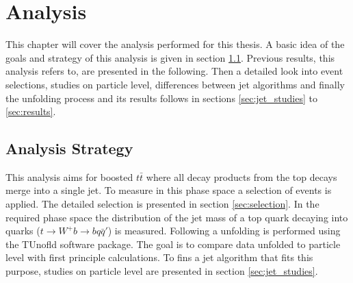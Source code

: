 \chapter{Analysis}
\label{ch:Ana}
	This chapter will cover the analysis performed for this thesis. A basic idea of the goals and strategy of this analysis is given in section \ref{sec:strategy}. Previous results, this analysis refers to, are presented in the following. Then a detailed look into event selections, studies on particle level, differences between jet algorithms and finally the unfolding process and its results follows in sections \ref{sec:jet_studies} to \ref{sec:results}.
\section{Analysis Strategy}
\label{sec:strategy}
	This analysis aims for boosted $t\bar{t}$ where all decay products from the top decays merge into a single jet. To measure in this phase space a selection of events is applied. The detailed selection is presented in section \ref{sec:selection}. In the required phase space the distribution of the jet mass of a top quark decaying into quarks ($t\rightarrow W^{+} b \rightarrow b q \bar{q}'$) is measured. Following a unfolding is performed using the TUnofld \cite{tunfold} software package. The goal is to compare data unfolded to particle level with first principle calculations. To fins a jet algorithm that fits this purpose, studies on particle level are presented in section \ref{sec:jet_studies}.
	
